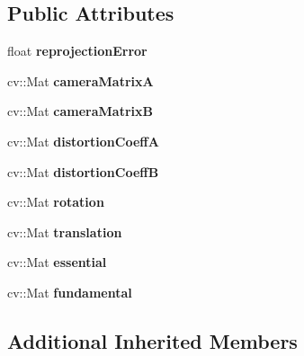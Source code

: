 \subsection*{Public Attributes}
\begin{DoxyCompactItemize}
\item 
float {\bfseries reprojection\+Error}\hypertarget{classStereoCal_a85aebb318142fa919f0d4f9e3d0eb573}{}\label{classStereoCal_a85aebb318142fa919f0d4f9e3d0eb573}

\item 
cv\+::\+Mat {\bfseries camera\+MatrixA}\hypertarget{classStereoCal_a6b3f31ee923df2aa4db3edf0b16c2abb}{}\label{classStereoCal_a6b3f31ee923df2aa4db3edf0b16c2abb}

\item 
cv\+::\+Mat {\bfseries camera\+MatrixB}\hypertarget{classStereoCal_af615493765ddf531152351478bda22e9}{}\label{classStereoCal_af615493765ddf531152351478bda22e9}

\item 
cv\+::\+Mat {\bfseries distortion\+CoeffA}\hypertarget{classStereoCal_a833dc88d30a025e44cb560de29f05816}{}\label{classStereoCal_a833dc88d30a025e44cb560de29f05816}

\item 
cv\+::\+Mat {\bfseries distortion\+CoeffB}\hypertarget{classStereoCal_a501c693df5f84d9d19577ac0adbabbf1}{}\label{classStereoCal_a501c693df5f84d9d19577ac0adbabbf1}

\item 
cv\+::\+Mat {\bfseries rotation}\hypertarget{classStereoCal_a7beed9f0fb6cc3cc597ca7d37c5ed713}{}\label{classStereoCal_a7beed9f0fb6cc3cc597ca7d37c5ed713}

\item 
cv\+::\+Mat {\bfseries translation}\hypertarget{classStereoCal_a34118e7ac1b2bbd4ee1bb1ff09a61440}{}\label{classStereoCal_a34118e7ac1b2bbd4ee1bb1ff09a61440}

\item 
cv\+::\+Mat {\bfseries essential}\hypertarget{classStereoCal_a29a19767e991bf81d531107c5263efd2}{}\label{classStereoCal_a29a19767e991bf81d531107c5263efd2}

\item 
cv\+::\+Mat {\bfseries fundamental}\hypertarget{classStereoCal_ae0a265612be88dfc178e7e41b7a9ec77}{}\label{classStereoCal_ae0a265612be88dfc178e7e41b7a9ec77}

\end{DoxyCompactItemize}
\subsection*{Additional Inherited Members}


